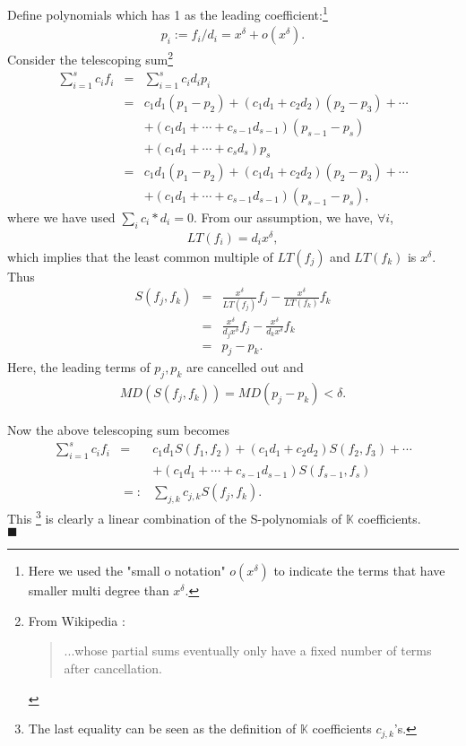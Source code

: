 \documentclass[11pt]{book}
\begin{document}
Define polynomials which has 1 as the leading coefficient:\footnote{Here we used the "small o notation" $o(x^\delta)$ to indicate the terms that have smaller multi degree than $x^\delta$.}
\begin{eqnarray}
p_i := f_i/d_i = x^\delta + o(x^\delta).
\end{eqnarray}
Consider the telescoping sum\footnote{
From Wikipedia : \begin{quote}
...whose partial sums eventually only have a fixed number of terms after cancellation.
\end{quote}
}
\begin{eqnarray}
\sum_{i=1}^s c_i f_i &=& \sum_{i=1}^s c_i d_i p_i \\
\nonumber
&=& c_1 d_1 (p_1 -p_2) + (c_1d_1 + c_2 d_2)(p_2 -p_3) + \cdots \\
\nonumber
&&+ (c_1d_1 + \cdots + c_{s-1} d_{s-1})(p_{s-1} - p_s) \\
\nonumber
&&+ (c_1d_1 + \cdots + c_s d_s) p_s \\
\nonumber
&=& c_1 d_1 (p_1 -p_2) + (c_1d_1 + c_2 d_2)(p_2 -p_3) + \cdots \\
&&+ (c_1d_1 + \cdots + c_{s-1} d_{s-1})(p_{s-1} - p_s),
\end{eqnarray}
where we have used $\sum_i c_i * d_i = 0$.
From our assumption, we have, $\forall i$,
\begin{eqnarray}
LT(f_i) = d_i x^\delta,
\end{eqnarray}
which implies that the least common multiple of $LT(f_j)$ and $LT(f_k)$ is $x^\delta$.
Thus
\begin{eqnarray}
S(f_j, f_k) &=& \frac{x^\delta}{LT(f_j)}f_j- \frac{x^\delta}{LT(f_k)}f_k \\
&=& \frac{x^\delta}{d_j x^\delta}f_j- \frac{x^\delta}{d_k x^\delta}f_k \\
&=& p_j - p_k.
\end{eqnarray}
Here, the leading terms of $p_j, p_k$ are cancelled out and
\begin{eqnarray}
MD\left( S(f_j, f_k) \right) = MD(p_j -p_k) < \delta.
\end{eqnarray}

Now the above telescoping sum becomes
\begin{eqnarray}
\nonumber
\sum_{i=1}^s c_i f_i &=& c_1 d_1 S(f_1, f_2) + (c_1d_1 + c_2 d_2)S(f_2, f_3) + \cdots\\
&& + (c_1d_1 + \cdots + c_{s-1}d_{s-1}) S(f_{s-1}, f_s) \\
&=:& \sum_{j,k} c_{j,k} S(f_j, f_k).
\end{eqnarray}
This \footnote{The last equality can be seen as the definition of $\mathbb{K}$ coefficients $c_{j,k}$'s.} is clearly a linear combination of the S-polynomials of $\mathbb{K}$ coefficients.\\
$\blacksquare$
\end{document}

